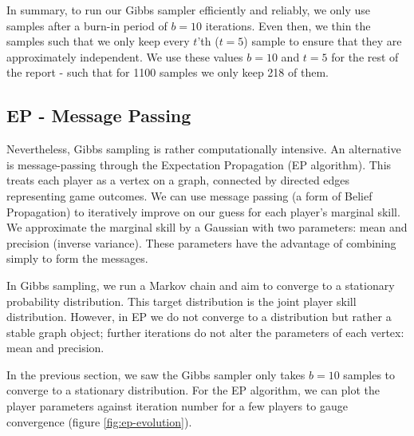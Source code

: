 \documentclass[]{article}
\begin{document}
In summary, to run our Gibbs sampler efficiently and reliably, we only use samples after a burn-in period of $b=10$ iterations. Even then, we thin the samples such that we only keep every $t$'th ($t=5$) sample to ensure that they are approximately independent. We use these values $b=10$ and $t=5$ for the rest of the report - such that for 1100 samples we only keep 218 of them.

\clearpage
\subsection{EP - Message Passing}

Nevertheless, Gibbs sampling is rather computationally intensive. An alternative is message-passing through the Expectation Propagation (EP algorithm). This treats each player as a vertex on a graph, connected by directed edges representing game outcomes. We can use message passing (a form of Belief Propagation) to iteratively improve on our guess for each player's marginal skill. We approximate the marginal skill by a Gaussian with two parameters: mean and precision (inverse variance). These parameters have the advantage of combining simply to form the messages.

In Gibbs sampling, we run a Markov chain and aim to converge to a stationary probability distribution. This target distribution is the joint player skill distribution. However, in EP we do not converge to a distribution but rather a stable graph object; further iterations do not alter the parameters of each vertex: mean and precision.

In the previous section, we saw the Gibbs sampler only takes $b=10$ samples to converge to a stationary distribution. For the EP algorithm, we can plot the player parameters against iteration number for a few players to gauge convergence (figure \ref{fig:ep-evolution}).
\end{document}

